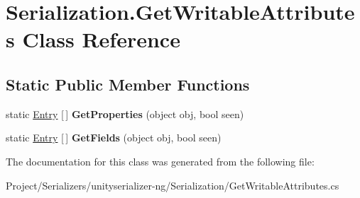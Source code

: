 \hypertarget{class_serialization_1_1_get_writable_attributes}{}\section{Serialization.\+Get\+Writable\+Attributes Class Reference}
\label{class_serialization_1_1_get_writable_attributes}
\subsection*{Static Public Member Functions}
\begin{DoxyCompactItemize}
\item 
\mbox{\label{class_serialization_1_1_get_writable_attributes_a328ba45c8e2f2e9678371ca201974632}} 
static \hyperlink{class_serialization_1_1_entry}{Entry} \mbox{[}$\,$\mbox{]} {\bfseries Get\+Properties} (object obj, bool seen)
\item 
\mbox{\label{class_serialization_1_1_get_writable_attributes_a10c919168247cac64afcf05af9d56838}} 
static \hyperlink{class_serialization_1_1_entry}{Entry} \mbox{[}$\,$\mbox{]} {\bfseries Get\+Fields} (object obj, bool seen)
\end{DoxyCompactItemize}


The documentation for this class was generated from the following file\+:\begin{DoxyCompactItemize}
\item 
Project/\+Serializers/unityserializer-\/ng/\+Serialization/Get\+Writable\+Attributes.\+cs\end{DoxyCompactItemize}
